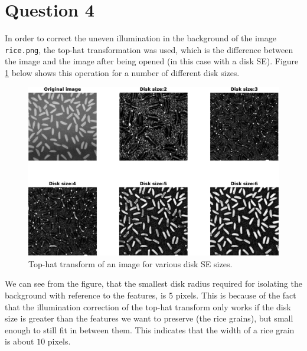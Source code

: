 \documentclass[a4paper]{article}
\begin{document}
\section*{Question 4}
In order to correct the uneven illumination in the background of the image \texttt{rice.png}, the top-hat transformation was used, which is the difference between the image and the image after being opened (in this case with a disk SE). Figure \ref{fig:q4} below shows this operation for a number of different disk sizes.
\begin{figure}[H]
  \begin{center}
    \includegraphics[width=\textwidth]{q4.pdf}
  \end{center}
  \caption{Top-hat transform of an image for various disk SE sizes.}
  \label{fig:q4}
\end{figure}
We can see from the figure, that the smallest disk radius required for isolating the background with reference to the features, is $5$ pixels. This is because of the fact that the illumination correction of the top-hat transform only works if the disk size is greater than the features we want to preserve (the rice grains), but small enough to still fit in between them. This indicates that the width of a rice grain is about $10$ pixels.
\end{document}
